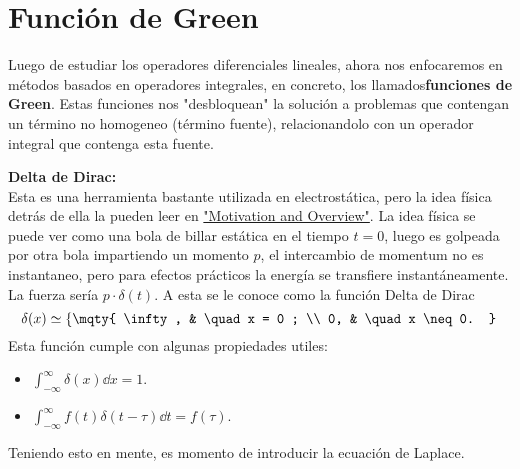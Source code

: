 \section*{Función de Green}
Luego de estudiar los operadores diferenciales lineales, ahora nos enfocaremos en métodos basados en operadores integrales, en concreto, los llamados\textbf{funciones de Green}. Estas funciones nos "desbloquean" la solución a problemas que contengan un término no homogeneo (término fuente), relacionandolo con un operador integral que contenga esta fuente. \\



\begin{mdframed}[style=warning]
	{\Large \textbf{Delta de Dirac:}} \\
	Esta es una herramienta bastante utilizada en electrostática, pero la idea física detrás de ella la pueden leer en \href{https://en.wikipedia.org/wiki/Dirac_delta_function#Motivation_and_overview}{"Motivation and Overview"}. La idea física se puede ver como una bola de billar estática en el tiempo $t = 0$, luego es golpeada por otra bola impartiendo un momento $p$, el intercambio de momentum no es instantaneo, pero para efectos prácticos la energía se transfiere instantáneamente. La fuerza sería $p\cdot \delta (t)$. A esta se le conoce como la función Delta de Dirac
		$$ \delta (x) \simeq \left\{ \mqty{ \infty , & \quad x = 0 ; \\ 0, & \quad x \neq 0. } \right. $$
	Esta función cumple con algunas propiedades utiles:
	\begin{itemize}
		\item $\int _{-\infty} ^\infty \delta (x) \dd{x} = 1.$
		\item $ \int _{-\infty} ^\infty f(t) \delta (t - \tau) \dd{t} = f(\tau). $
	\end{itemize}
\end{mdframed}




Teniendo esto en mente, es momento de introducir la ecuación de Laplace.




